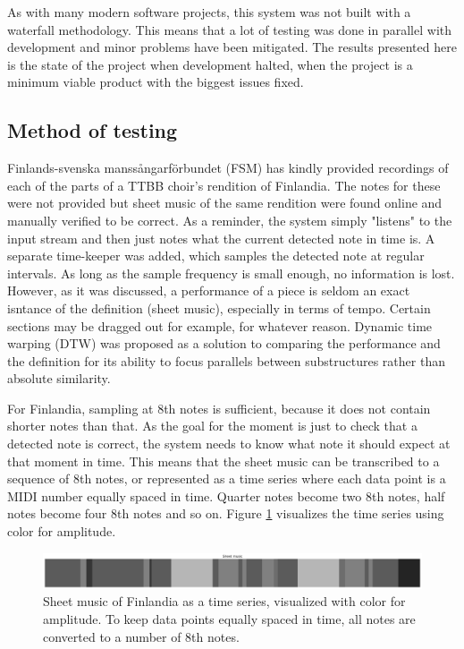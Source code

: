As with many modern software projects, this system was not built with a waterfall methodology. This means that a lot of testing was done in parallel with development and minor problems have been mitigated. The results presented here is the state of the project when development halted, when the project is a minimum viable product with the biggest issues fixed.

\subsection{Method of testing}
Finlands-svenska manssångarförbundet (FSM) has kindly provided recordings of each of the parts of a TTBB choir's rendition of Finlandia. The notes for these were not provided but sheet music of the same rendition were found online and manually verified to be correct. As a reminder, the system simply "listens" to the input stream and then just notes what the current detected note in time is. A separate time-keeper was added, which samples the detected note at regular intervals. As long as the sample frequency is small enough, no information is lost. However, as it was discussed, a performance of a piece is seldom an exact isntance of the definition (sheet music), especially in terms of tempo. Certain sections may be dragged out for example, for whatever reason. Dynamic time warping (DTW) was proposed as a solution to comparing the performance and the definition for its ability to focus parallels between substructures rather than absolute similarity.

For Finlandia, sampling at 8th notes is sufficient, because it does not contain shorter notes than that. As the goal for the moment is just to check that a detected note is correct, the system needs to know what note it should expect at that moment in time. This means that the sheet music can be transcribed to a sequence of 8th notes, or represented as a time series where each data point is a MIDI number equally spaced in time. Quarter notes become two 8th notes, half notes become four 8th notes and so on. Figure \ref{fig:sheetEncoding} visualizes the time series using color for amplitude.

\begin{figure}[ht]
    \centering
    \includegraphics[width=\textwidth]{./images/sheetEncoding.png}
    \caption{Sheet music of Finlandia as a time series, visualized with color for amplitude. To keep data points equally spaced in time, all notes are converted to a number of 8th notes. \label{fig:sheetEncoding}}
\end{figure}

